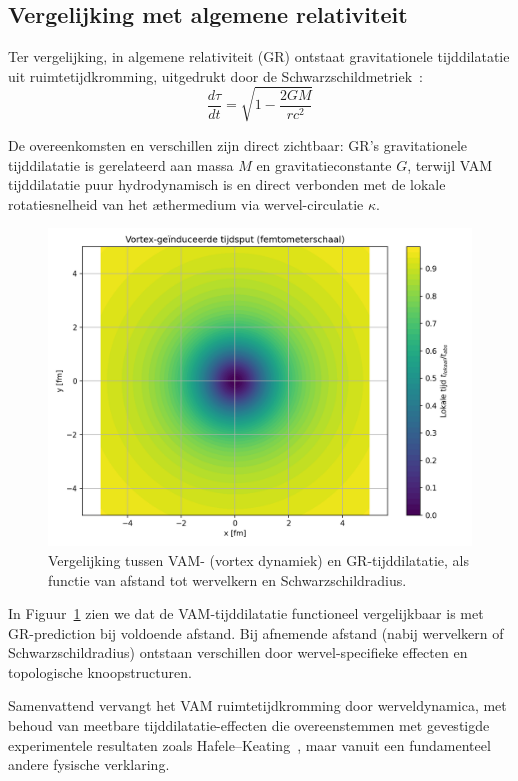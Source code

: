 \subsection{Vergelijking met algemene relativiteit}

Ter vergelijking, in algemene relativiteit (GR) ontstaat gravitationele tijddilatatie uit ruimtetijdkromming, uitgedrukt door de Schwarzschildmetriek~\cite{schutz2009first}:
\begin{equation}\label{eq:GRtijd}
    \frac{d\tau}{dt} = \sqrt{1 - \frac{2GM}{rc^2}}
\end{equation}


De overeenkomsten en verschillen zijn direct zichtbaar: GR's gravitationele tijddilatatie is gerelateerd aan massa $M$ en gravitatieconstante $G$, terwijl VAM tijddilatatie puur hydrodynamisch is en direct verbonden met de lokale rotatiesnelheid van het æthermedium via wervel-circulatie $\kappa$.

\begin{figure}[ht!]
    \centering
    \includegraphics[width=0.7\linewidth]{02-RadialProfileOfLocalTimeDilation_Vortex-Induced_Time_Well_nl}
    \caption{Vergelijking tussen VAM- (vortex dynamiek) en GR-tijddilatatie, als functie van afstand tot wervelkern en Schwarzschildradius.}
    \label{fig:vergelijking_VAMGR}
\end{figure}

In Figuur~\ref{fig:vergelijking_VAMGR} zien we dat de VAM-tijddilatatie functioneel vergelijkbaar is met GR-prediction bij voldoende afstand. Bij afnemende afstand (nabij wervelkern of Schwarzschildradius) ontstaan verschillen door wervel-specifieke effecten en topologische knoopstructuren.

Samenvattend vervangt het VAM ruimtetijdkromming door werveldynamica, met behoud van meetbare tijddilatatie-effecten die overeenstemmen met gevestigde experimentele resultaten zoals Hafele–Keating~\cite{hafele1972around}, maar vanuit een fundamenteel andere fysische verklaring.


